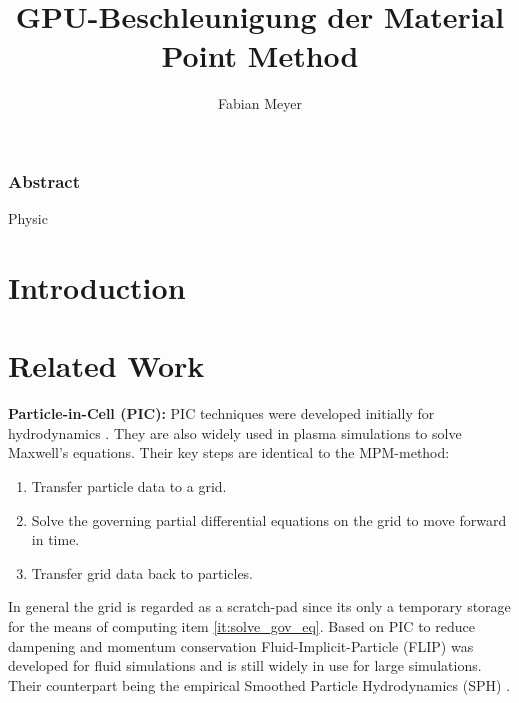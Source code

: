 \documentclass[m,times]{cgMA}
\begin{document}
\author{Fabian Meyer}
\title{GPU-Beschleunigung der Material Point Method}

\maketitle

\clearpage
{}
\subsubsection*{Abstract}

\noindent Physic


\clearpage
\tableofcontents

\clearpage         %
{}


\section{Introduction} \label{intro}
\section{Related Work}
\textbf{Particle-in-Cell (PIC):} PIC techniques were developed initially for hydrodynamics
\cite{evans1957particle}. They are also widely used in plasma simulations to solve Maxwell's equations. Their key steps are identical to the MPM-method:
\begin{enumerate}
  \item Transfer particle data to a grid.
\item \label{it:solve_gov_eq}Solve the governing partial differential equations on the grid to move forward in time.
  \item Transfer grid data back to particles.
\end{enumerate}
In general the grid is regarded as a scratch-pad since its only a temporary storage for the means of computing item \ref{it:solve_gov_eq}. Based on PIC to reduce dampening and momentum conservation Fluid-Implicit-Particle (FLIP) was developed for fluid simulations and is still widely in use for large simulations. Their counterpart being the empirical Smoothed Particle Hydrodynamics (SPH) \cite{gingold1977smoothed}.
\end{document}
